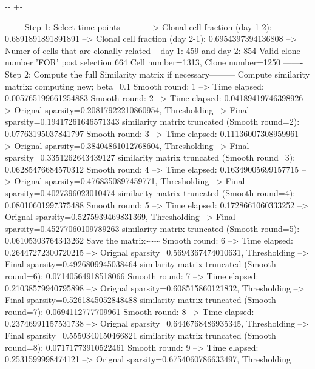 \documentclass[letterpaper,10pt,english]{sphinxmanual}
\newlength\nbsphinxcodecellspacing
\begin{document}
{

\kern-\sphinxverbatimsmallskipamount\kern-\baselineskip
\kern+\FrameHeightAdjust\kern-\fboxrule
\vspace{\nbsphinxcodecellspacing}

\begin{sphinxVerbatim}[commandchars=\\\{\}]
-------Step 1: Select time points---------
--> Clonal cell fraction (day 1-2): 0.6891891891891891
--> Clonal cell fraction (day 2-1): 0.6954397394136808
--> Numer of cells that are clonally related -- day 1: 459  and day 2: 854
Valid clone number 'FOR' post selection 664
Cell number=1313, Clone number=1250
-------Step 2: Compute the full Similarity matrix if necessary---------
Compute similarity matrix: computing new; beta=0.1
Smooth round: 1
--> Time elapsed: 0.005765199661254883
Smooth round: 2
--> Time elapsed: 0.04189419746398926
--> Orignal sparsity=0.20817922210860954, Thresholding
--> Final sparsity=0.19417261646571343
similarity matrix truncated (Smooth round=2):  0.07763195037841797
Smooth round: 3
--> Time elapsed: 0.11136007308959961
--> Orignal sparsity=0.38404861012768604, Thresholding
--> Final sparsity=0.3351262643439127
similarity matrix truncated (Smooth round=3):  0.06285476684570312
Smooth round: 4
--> Time elapsed: 0.16349005699157715
--> Orignal sparsity=0.4768350897459771, Thresholding
--> Final sparsity=0.4027396023010474
similarity matrix truncated (Smooth round=4):  0.08010601997375488
Smooth round: 5
--> Time elapsed: 0.1728661060333252
--> Orignal sparsity=0.5275939469831369, Thresholding
--> Final sparsity=0.45277060109789263
similarity matrix truncated (Smooth round=5):  0.06105303764343262
Save the matrix\textasciitilde{}\textasciitilde{}\textasciitilde{}
Smooth round: 6
--> Time elapsed: 0.26447272300720215
--> Orignal sparsity=0.5694367474010631, Thresholding
--> Final sparsity=0.4926809945038464
similarity matrix truncated (Smooth round=6):  0.07140564918518066
Smooth round: 7
--> Time elapsed: 0.21038579940795898
--> Orignal sparsity=0.608515860121832, Thresholding
--> Final sparsity=0.5261845052848488
similarity matrix truncated (Smooth round=7):  0.0694112777709961
Smooth round: 8
--> Time elapsed: 0.23746991157531738
--> Orignal sparsity=0.6446768486935345, Thresholding
--> Final sparsity=0.5550340150466821
similarity matrix truncated (Smooth round=8):  0.07171773910522461
Smooth round: 9
--> Time elapsed: 0.2531599998474121
--> Orignal sparsity=0.6754060786633497, Thresholding

\end{sphinxVerbatim}}
\end{document}
